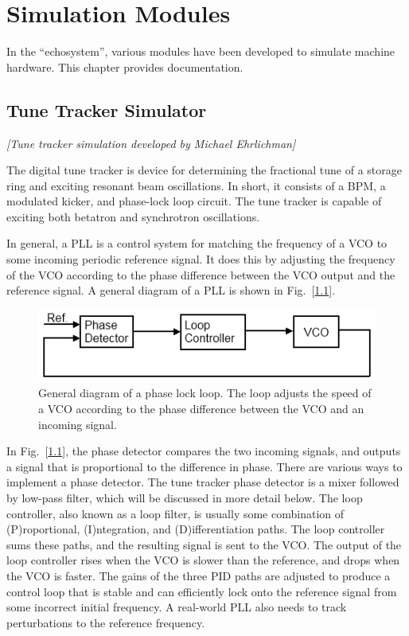 \chapter{Simulation Modules}

In the \bmad ``echosystem'', various modules have been developed to
simulate machine hardware. This chapter provides documentation.

\section{Tune Tracker Simulator}

\textit{\large [Tune tracker simulation developed by Michael Ehrlichman]}

The digital tune tracker is device for determining the fractional
tune of a storage ring and exciting resonant beam oscillations.  In
short, it consists of a BPM, a modulated kicker, and phase-lock loop
circuit.  The tune tracker is capable of exciting both betatron and
synchrotron oscillations.

In general, a PLL is a control system for matching the frequency of a
VCO to some incoming periodic reference signal.  It does this by
adjusting the frequency of the VCO according to the phase difference
between the VCO output and the reference signal.  A general diagram of
a PLL is shown in Fig.~[\ref{f:PLL}].

\begin{figure}[h]
\centering
\includegraphics{PLL.png}
\caption[General diagram of a phase lock loop.]{
General diagram of a phase lock loop. The loop adjusts the speed of a VCO according to the 
phase difference between the VCO and an incoming signal.}
\label{f:PLL}
\end{figure}

In Fig.~[\ref{f:PLL}], the phase detector compares the two incoming
signals, and outputs a signal that is proportional to the difference
in phase.  There are various ways to implement a phase detector.  The
tune tracker phase detector is a mixer followed by low-pass filter,
which will be discussed in more detail below.  The loop controller,
also known as a loop filter, is usually some combination of
(P)roportional, (I)ntegration, and (D)ifferentiation paths.  The loop
controller sums these paths, and the resulting signal is sent to the
VCO.  The output of the loop controller rises when the VCO is slower
than the reference, and drops when the VCO is faster.  The gains of
the three PID paths are adjusted to produce a control loop that is
stable and can efficiently lock onto the reference signal from some
incorrect initial frequency.  A real-world PLL also needs to track
perturbations to the reference frequency.

